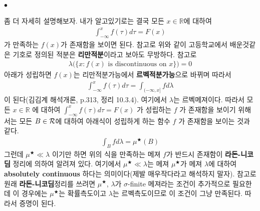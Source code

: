 \documentclass[12pt,oneside,english,a4paper]{article}
\def\ck{\paragraph{\Large$\bullet$}\Large}
\begin{document}
\ck 좀 더 자세히 설명해보자. 내가 알고있기로는 결국 모든 $x\in\mathbb{R}$에 대하여 
\begin{align*}
\int_{-\infty}^{x} f(\tau) d\tau = F(x) 
\end{align*}
가 만족하는 $f(x)$가 존재함을 보이면 된다. 참고로 위와 같이 고등학교에서 배운것같은 기호로 정의된 적분은 \textbf{리만적분}이라고 보아도 무방하다. 참고로 
\begin{align*}
\lambda\Big(\{ x: f(x) \mbox{ is discontinuous on } x\} \Big)=0
\end{align*}
아래가 성립하면 
$f(x)$는 리만적분가능에서 \textbf{르벡적분가능}으로 바뀌며 따라서 
\begin{align*}
\int_{-\infty}^{x} f(\tau) d\tau=\int_{(-\infty,x]} fd\lambda
\end{align*}
이 된다(김김계 해석개론, p.313, 정리 10.3.4). 여기에서 $\lambda$는 르벡메져이다. 따라서 모든 $x \in \mathbb{R}$ 에 대하여 $\int_{-\infty}^{x} f(\tau) d\tau = F(x)$ 가 성립하는 $f$ 가 존재함을 보이기 위해서는 모든 $B \in {\cal R}$에 대하여 아래식이 성립하게 하는 함수 $f$ 가 존재함을 보이는 것과 같다. 
\begin{align*}
\int_B f d\lambda = \mu^{\bigstar} (B)
\end{align*}
그런데 $\mu^{\bigstar} \ll \lambda$ 이기만 하면 위의 식을 만족하는 메져 $f$가 반드시 존재함이 \textbf{라돈-니코딤} 정리에 의하여 알려져 있다. 여기에서 $\mu^{\bigstar} \ll \lambda$는 메져 $\mu^{\bigstar}$가 메져 $\lambda$에 대하여 \textbf{absolutely continuous} 하다는 의미이다(제발 매우작다라고 해석하지 말자). 참고로 원래 \textbf{라돈-니코딤}정리를 쓰려면 $\mu^{\bigstar}$, $\lambda$가 $\sigma$-finite 메져라는 조건이 추가적으로 필요한데 이 경우에는 $\mu^{\bigstar}$는 확률측도이고 $\lambda$는 르벡측도이므로 이 조건이 그냥 만족된다. 따라서 증명이 된다. 
\end{document}
